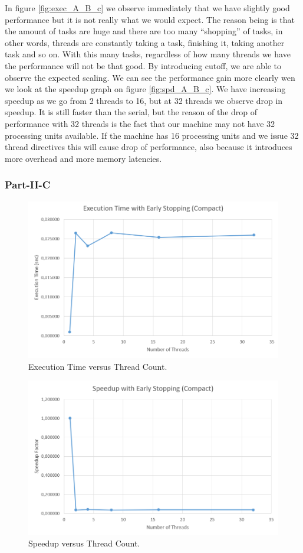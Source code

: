 \documentclass[11pt,reqno]{amsart}
\begin{document}
In figure \ref{fig:exec_A_B_c} we observe immediately that we have slightly good performance but it is not really what we would expect. The reason being is that the amount of tasks are huge and there are too many ``shopping'' of tasks, in other words, threads are constantly taking a task, finishing it, taking another task and so on. With this many tasks, regardless of how many threads we have the performance will not be that good. By introducing cutoff, we are able to observe the expected scaling. We can see the performance gain more clearly wen we look at the speedup graph on figure \ref{fig:spd_A_B_c}. We have increasing speedup as we go from 2 threads to 16, but at 32 threads we observe drop in speedup. It is still faster than the serial, but the reason of the drop of performance with 32 threads is the fact that our machine may not have 32 processing units available. If the machine has 16 processing units and we issue 32 thread directives this will cause drop of performance, also because it introduces more overhead and more memory latencies.

\subsubsection{Part-II-C}

\begin{figure}[h]
\centering
\includegraphics[width=0.75\linewidth]{early_stop_compact.png}
\caption{Execution Time versus Thread Count.}
\label{fig:early_c}
\end{figure}

\begin{figure}[h]
\centering
\includegraphics[width=0.75\linewidth]{speed_early_stop_compact.png}
\caption{Speedup versus Thread Count.}
\label{fig:speed_early_c}
\end{figure}
\end{document}
